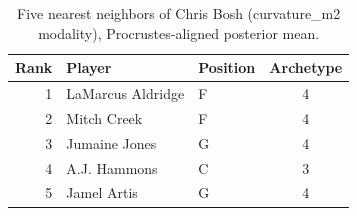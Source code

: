 \begin{table}[htbp]
  \centering\small
  \begin{tabular}{rllc}
    \toprule
    Rank & Player & Position & Archetype \\
    \midrule
    1 & LaMarcus Aldridge & F & 4 \\
    2 & Mitch Creek & F & 4 \\
    3 & Jumaine Jones & G & 4 \\
    4 & A.J. Hammons & C & 3 \\
    5 & Jamel Artis & G & 4 \\
    \bottomrule
  \end{tabular}
  \caption{Five nearest neighbors of Chris Bosh (curvature_m2 modality), Procrustes-aligned posterior mean.}
  \label{tab:Chris_Bosh_neighbors_curvature_m2}
\end{table}

